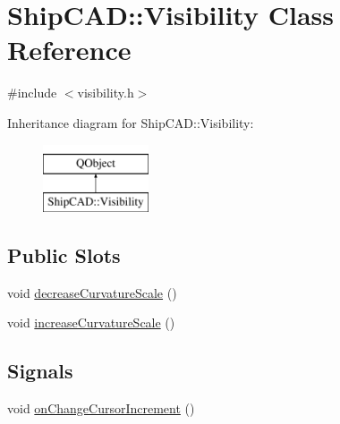 \hypertarget{classShipCAD_1_1Visibility}{\section{Ship\-C\-A\-D\-:\-:Visibility Class Reference}
\label{classShipCAD_1_1Visibility}
}


{\ttfamily \#include $<$visibility.\-h$>$}

Inheritance diagram for Ship\-C\-A\-D\-:\-:Visibility\-:\begin{figure}[H]
\begin{center}
\leavevmode
\includegraphics[height=2.000000cm]{classShipCAD_1_1Visibility}
\end{center}
\end{figure}
\subsection*{Public Slots}
\begin{DoxyCompactItemize}
\item 
void \hyperlink{classShipCAD_1_1Visibility_ace6a4ea4e6ce23b4ed801aaaa645930a}{decrease\-Curvature\-Scale} ()
\item 
void \hyperlink{classShipCAD_1_1Visibility_a77e989d8346064ef7a8351126901d485}{increase\-Curvature\-Scale} ()
\end{DoxyCompactItemize}
\subsection*{Signals}
\begin{DoxyCompactItemize}
\item 
void \hyperlink{classShipCAD_1_1Visibility_a16de65dec1636dd1edc69b15d84c7735}{on\-Change\-Cursor\-Increment} ()
\end{DoxyCompactItemize}
